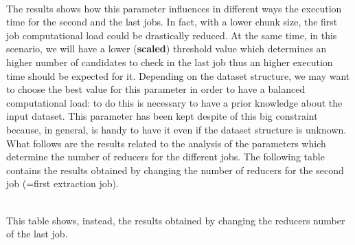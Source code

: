 \documentclass[]{report}
\begin{document}
	\vspace{-0.5cm}
	\\    	          	
   	The results shows how this parameter influences in different ways the execution time for the second and the last jobs. In fact, with a lower chunk size, the first job computational load could be drastically reduced. At the same time, in this scenario, we will have a lower (\textbf{scaled}) threshold value which determines an higher number of candidates to check in the last job thus an higher execution time should be expected for it. Depending on the dataset structure, we may want to choose the best value for this parameter in order to have a balanced computational load: to do this is necessary to have a prior knowledge about the input dataset. This parameter has been kept despite of this big constraint because, in general, is handy to have it even if the dataset structure is unknown.\\
   	What follows are the results related to the analysis of the parameters which determine the number of reducers for the different jobs.
   	The following table contains the results obtained by changing the number of reducers for the second job (=first extraction job).	  
   	\begin{figure}[h]
   		\centering
   	\end{figure}
   	\vspace{-0.55cm}
   	\\  	          	
   	This table shows, instead, the results obtained by changing the reducers number of the last job.
   	\begin{figure}[h]
   		\centering
   	\end{figure}	
\end{document}
